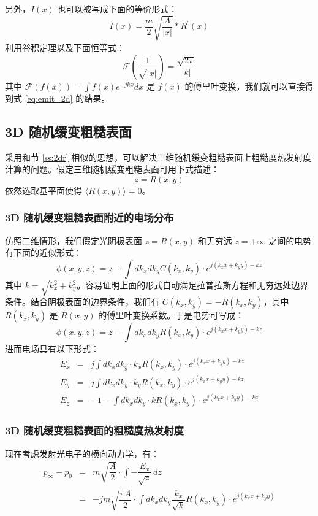 另外，$I(x)$ 也可以被写成下面的等价形式：
\begin{equation}
I(x) = \frac{m}{2}\sqrt{\frac{A}{|x|}}\ast R^{\prime}(x)
\label{eq:conv}
\end{equation}
利用卷积定理以及下面恒等式：
\[
\mathcal{F}\left(\dfrac{1}{\sqrt{|x|}}\right) = \frac{\sqrt{2\pi}}{|k|}
\]
其中 $\mathcal{F}\left(f(x)\right) = \int f(x)e^{-jkx}dx$ 是 $f(x)$ 的傅里叶变换，我们就可以直接得到式 \ref{eq:emit_2d} 的结果。

\subsection{\label{ss:3d}3D 随机缓变粗糙表面}
采用和节 \ref{ss:2dr} 相似的思想，可以解决三维随机缓变粗糙表面上粗糙度热发射度计算的问题。假定三维随机缓变粗糙表面可用下式描述：
\[
z = R(x, y)
\]
依然选取基平面使得 $\langle R(x, y)\rangle=0$。

\subsubsection{3D 随机缓变粗糙表面附近的电场分布}
仿照二维情形，我们假定光阴极表面 $z = R(x, y)$ 和无穷远 $z = +\infty$ 之间的电势有下面的近似形式：
\[
\phi(x, y, z) = z + \int dk_xdk_yC(k_x, k_y)\cdot e^{j(k_xx+k_yy)-kz}
\]
其中 $k=\sqrt{k_x^2+k_y^2}$。容易证明上面的形式自动满足拉普拉斯方程和无穷远处边界条件。结合阴极表面的边界条件，我们有 $C(k_x, k_y)=-R(k_x, k_y)$，其中 $R(k_x, k_y)$ 是 $R(x, y)$ 的傅里叶变换系数。于是电势可写成：
\[
\phi(x, y, z) = z - \int dk_xdk_yR(k_x, k_y)\cdot e^{j(k_xx+k_yy)-kz}
\]
进而电场具有以下形式：
\begin{eqnarray*}
E_x &=& j\int dk_xdk_y\cdot k_xR(k_x, k_y)\cdot e^{j(k_xx+k_yy)-kz} \\
E_y &=& j\int dk_xdk_y\cdot k_yR(k_x, k_y)\cdot e^{j(k_xx+k_yy)-kz} \\
E_z &=& -1-\int dk_xdk_y\cdot kR(k_x, k_y)\cdot e^{j(k_xx+k_yy)-kz}
\end{eqnarray*}

\subsubsection{3D 随机缓变粗糙表面的粗糙度热发射度}
现在考虑发射光电子的横向动力学，有：
\begin{eqnarray}
p_{\infty}-p_0 &=& m\sqrt{\dfrac{A}{2}}\cdot\int-\dfrac{E_x}{\sqrt{z}}\,dz\\\label{eq:p_field_3d}
&=& -jm\sqrt{\dfrac{\pi A}{2}}\cdot\int dk_xdk_y\dfrac{k_x}{\sqrt{k}}R(k_x, k_y)\cdot e^{j(k_xx+k_yy)}\nonumber
\end{eqnarray}

